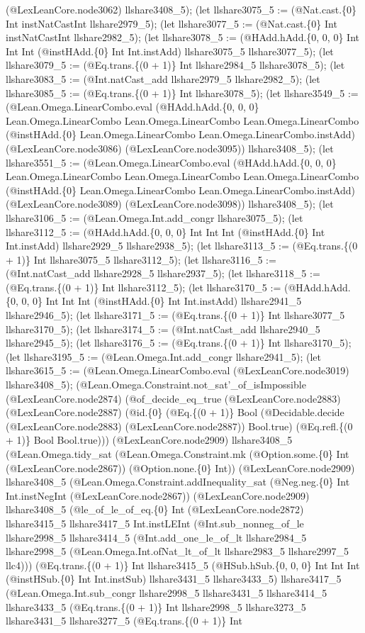 \documentclass[11pt]{article}
\begin{document}
(@LexLeanCore.node3062) llshare3408\_5); (let llshare3075\_5 := (@Nat.cast.\{0\} Int instNatCastInt llshare2979\_5); (let llshare3077\_5 := (@Nat.cast.\{0\} Int instNatCastInt llshare2982\_5); (let llshare3078\_5 := (@HAdd.hAdd.\{0, 0, 0\} Int Int Int (@instHAdd.\{0\} Int Int.instAdd) llshare3075\_5 llshare3077\_5); (let llshare3079\_5 := (@Eq.trans.\{(0 + 1)\} Int llshare2984\_5 llshare3078\_5); (let llshare3083\_5 := (@Int.natCast\_add llshare2979\_5 llshare2982\_5); (let llshare3085\_5 := (@Eq.trans.\{(0 + 1)\} Int llshare3078\_5); (let llshare3549\_5 := (@Lean.Omega.LinearCombo.eval (@HAdd.hAdd.\{0, 0, 0\} Lean.Omega.LinearCombo Lean.Omega.LinearCombo Lean.Omega.LinearCombo (@instHAdd.\{0\} Lean.Omega.LinearCombo Lean.Omega.LinearCombo.instAdd) (@LexLeanCore.node3086) (@LexLeanCore.node3095)) llshare3408\_5); (let llshare3551\_5 := (@Lean.Omega.LinearCombo.eval (@HAdd.hAdd.\{0, 0, 0\} Lean.Omega.LinearCombo Lean.Omega.LinearCombo Lean.Omega.LinearCombo (@instHAdd.\{0\} Lean.Omega.LinearCombo Lean.Omega.LinearCombo.instAdd) (@LexLeanCore.node3089) (@LexLeanCore.node3098)) llshare3408\_5); (let llshare3106\_5 := (@Lean.Omega.Int.add\_congr llshare3075\_5); (let llshare3112\_5 := (@HAdd.hAdd.\{0, 0, 0\} Int Int Int (@instHAdd.\{0\} Int Int.instAdd) llshare2929\_5 llshare2938\_5); (let llshare3113\_5 := (@Eq.trans.\{(0 + 1)\} Int llshare3075\_5 llshare3112\_5); (let llshare3116\_5 := (@Int.natCast\_add llshare2928\_5 llshare2937\_5); (let llshare3118\_5 := (@Eq.trans.\{(0 + 1)\} Int llshare3112\_5); (let llshare3170\_5 := (@HAdd.hAdd.\{0, 0, 0\} Int Int Int (@instHAdd.\{0\} Int Int.instAdd) llshare2941\_5 llshare2946\_5); (let llshare3171\_5 := (@Eq.trans.\{(0 + 1)\} Int llshare3077\_5 llshare3170\_5); (let llshare3174\_5 := (@Int.natCast\_add llshare2940\_5 llshare2945\_5); (let llshare3176\_5 := (@Eq.trans.\{(0 + 1)\} Int llshare3170\_5); (let llshare3195\_5 := (@Lean.Omega.Int.add\_congr llshare2941\_5); (let llshare3615\_5 := (@Lean.Omega.LinearCombo.eval (@LexLeanCore.node3019) llshare3408\_5); (@Lean.Omega.Constraint.not\_sat'\_of\_isImpossible (@LexLeanCore.node2874) (@of\_decide\_eq\_true (@LexLeanCore.node2883) (@LexLeanCore.node2887) (@id.\{0\} (@Eq.\{(0 + 1)\} Bool (@Decidable.decide (@LexLeanCore.node2883) (@LexLeanCore.node2887)) Bool.true) (@Eq.refl.\{(0 + 1)\} Bool Bool.true))) (@LexLeanCore.node2909) llshare3408\_5 (@Lean.Omega.tidy\_sat (@Lean.Omega.Constraint.mk (@Option.some.\{0\} Int (@LexLeanCore.node2867)) (@Option.none.\{0\} Int)) (@LexLeanCore.node2909) llshare3408\_5 (@Lean.Omega.Constraint.addInequality\_sat (@Neg.neg.\{0\} Int Int.instNegInt (@LexLeanCore.node2867)) (@LexLeanCore.node2909) llshare3408\_5 (@le\_of\_le\_of\_eq.\{0\} Int (@LexLeanCore.node2872) llshare3415\_5 llshare3417\_5 Int.instLEInt (@Int.sub\_nonneg\_of\_le llshare2998\_5 llshare3414\_5 (@Int.add\_one\_le\_of\_lt llshare2984\_5 llshare2998\_5 (@Lean.Omega.Int.ofNat\_lt\_of\_lt llshare2983\_5 llshare2997\_5 llc4))) (@Eq.trans.\{(0 + 1)\} Int llshare3415\_5 (@HSub.hSub.\{0, 0, 0\} Int Int Int (@instHSub.\{0\} Int Int.instSub) llshare3431\_5 llshare3433\_5) llshare3417\_5 (@Lean.Omega.Int.sub\_congr llshare2998\_5 llshare3431\_5 llshare3414\_5 llshare3433\_5 (@Eq.trans.\{(0 + 1)\} Int llshare2998\_5 llshare3273\_5 llshare3431\_5 llshare3277\_5 (@Eq.trans.\{(0 + 1)\} Int 
\end{document}
